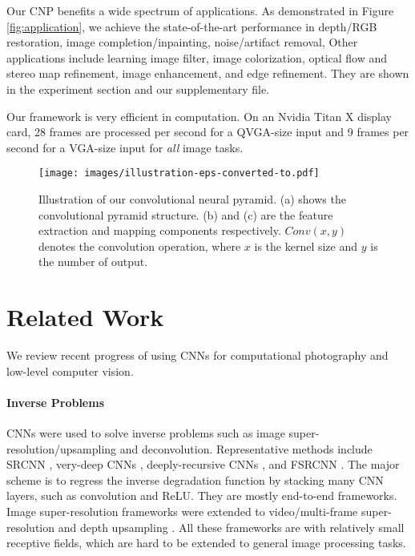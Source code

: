 \documentclass[10pt,twocolumn,letterpaper]{article}
\begin{document}
Our CNP benefits a wide spectrum of applications. As demonstrated in Figure
\ref{fig:application}, we achieve the state-of-the-art performance in depth/RGB restoration,
image completion/inpainting, noise/artifact removal, \etc Other applications include
learning image filter, image colorization, optical flow and stereo map refinement, image
enhancement, and edge refinement. They are shown in the experiment section and our
supplementary file.

Our framework is very efficient in computation. On an Nvidia Titan X display card, 28
frames are processed per second for a QVGA-size input and 9 frames per second for a VGA-size input for {\it all} image tasks.

\begin{figure*}[t]
\centering
\texttt{[image: images/illustration-eps-converted-to.pdf]}
\caption{Illustration of our convolutional neural pyramid. (a) shows the convolutional
pyramid structure. (b) and (c) are the feature extraction and mapping components
respectively. $Conv(x,y)$ denotes the convolution operation, where $x$ is the kernel size
and $y$ is the number of output.\vspace{-0.1in}} \label{fig:illustration}
\end{figure*}

\section{Related Work}

We review recent progress of using CNNs for computational photography and low-level
computer vision.

\vspace{-0.1in}\paragraph{Inverse Problems} CNNs were used to solve inverse problems such
as image super-resolution/upsampling and deconvolution. Representative methods include
SRCNN \cite{DongLHT16_SRCNN}, very-deep CNNs \cite{KimLL15b}, deeply-recursive CNNs
\cite{KimLL15a}, and FSRCNN \cite{DongLT16}. The major scheme is to regress the inverse
degradation function by stacking many CNN layers, such as convolution and ReLU. They are
mostly end-to-end frameworks. Image super-resolution frameworks were extended to
video/multi-frame super-resolution \cite{LiaoTLMJ15} and depth upsampling \cite{HuiLT16}.
All these frameworks are with relatively small receptive fields, which are hard to be
extended to general image processing tasks.
\end{document}

